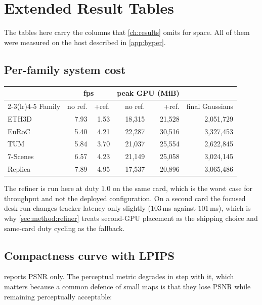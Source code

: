 \chapter{Extended Result Tables}
\label{app:tables}

The tables here carry the columns that \cref{ch:results} omits for space. All
of them were measured on the host described in \cref{app:hyper}.

\section{Per-family system cost}

\begin{center}
\small
\begin{tabular}{@{}lrrrrr@{}}
\toprule
& \multicolumn{2}{c}{fps} & \multicolumn{2}{c}{peak GPU (MiB)} & \\
\cmidrule(lr){2-3}\cmidrule(lr){4-5}
Family & no ref. & +ref. & no ref. & +ref. & final Gaussians \\
\midrule
ETH3D     & 7.93 & 1.53 & 18{,}315 & 21{,}528 & 2{,}051{,}729 \\
EuRoC     & 5.40 & 4.21 & 22{,}287 & 30{,}516 & 3{,}327{,}453 \\
TUM       & 5.84 & 3.70 & 21{,}037 & 25{,}554 & 2{,}622{,}845 \\
7-Scenes  & 6.57 & 4.23 & 21{,}149 & 25{,}058 & 3{,}024{,}145 \\
Replica   & 7.89 & 4.95 & 17{,}537 & 20{,}896 & 3{,}065{,}486 \\
\bottomrule
\end{tabular}
\end{center}

\noindent
The refiner is run here at duty $1.0$ on the same card, which is the
worst case for throughput and not the deployed configuration. On a second
card the focused desk run changes tracker latency only slightly ($103$\,ms
against $101$\,ms), which is why \cref{sec:method:refiner} treats second-GPU placement
as the shipping choice and same-card duty cycling as the fallback.

\section{Compactness curve with LPIPS}

 reports PSNR only. The perceptual metric degrades in step
with it, which matters because a common defence of small maps is that they
lose PSNR while remaining perceptually acceptable:

